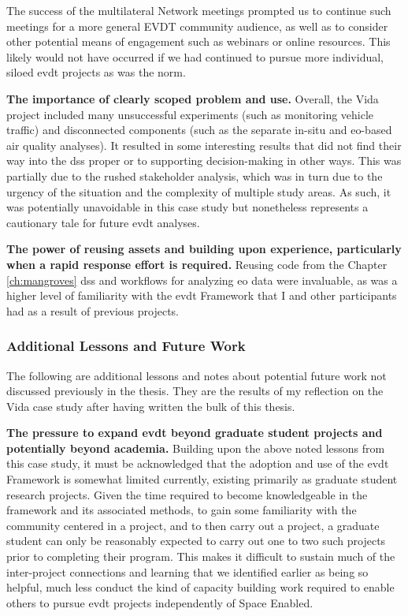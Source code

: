 The success of the multilateral Network meetings prompted us to continue such meetings for a more general EVDT community audience, as well as to consider other potential means of engagement such as webinars or online resources. This likely would not have occurred if we had continued to pursue more individual, siloed \ac{evdt} projects as was the norm.

\textbf{The importance of clearly scoped problem and use.} Overall, the Vida project included many unsuccessful experiments (such as monitoring vehicle traffic) and disconnected components (such as the separate in-situ and \ac{eo}-based air quality analyses). It resulted in some interesting results that did not find their way into the \ac{dss} proper or to supporting decision-making in other ways. This was partially due to the rushed stakeholder analysis, which was in turn due to the urgency of the situation and the complexity of multiple study areas. As such, it was potentially unavoidable in this case study but nonetheless represents a cautionary tale for future \ac{evdt} analyses.

\textbf{The power of reusing assets and building upon experience, particularly when a rapid response effort is required.} Reusing code from the Chapter \ref{ch:mangroves} \ac{dss} and workflows for analyzing \ac{eo} data were invaluable, as was a higher level of familiarity with the \ac{evdt} Framework that I and other participants had as a result of previous projects.

\subsubsection{Additional Lessons and Future Work}

The following are additional lessons and notes about potential future work not discussed previously in the thesis. They are the results of my reflection on the Vida case study after having written the bulk of this thesis.


\textbf{The pressure to expand \ac{evdt} beyond graduate student projects and potentially beyond academia.} Building upon the above noted lessons from this case study, it must be acknowledged that the adoption and use of the \ac{evdt} Framework is somewhat limited currently, existing primarily as graduate student research projects. Given the time required to become knowledgeable in the framework and its associated methods, to gain some familiarity with the community centered in a project, and to then carry out a project, a graduate student can only be reasonably expected to carry out one to two such projects prior to completing their program. This makes it difficult to sustain much of the inter-project connections and learning that we identified earlier as being so helpful, much less conduct the kind of capacity building work required to enable others to pursue \ac{evdt} projects independently of Space Enabled.

